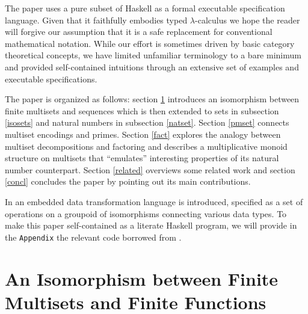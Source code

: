 \documentclass[]{INCLUDES/llncs}
\begin{document}
The paper uses a pure subset of Haskell as a formal executable specification
language. Given that it faithfully embodies typed $\lambda$-calculus
we hope the reader will forgive our assumption that it is a safe replacement for
conventional mathematical notation. While our effort is sometimes driven 
by basic category theoretical concepts, we have limited unfamiliar terminology
to a bare minimum and provided self-contained intuitions through an extensive
set of examples and executable specifications.

The paper is organized as follows: section \ref{msetiso} introduces an
isomorphism between finite multisets and sequences  which is then extended to
sets in subsection \ref{isosets} and natural numbers in subsection \ref{natset}.
Section \ref{pmset} connects multiset encodings and primes.
Section \ref{fact} explores the analogy between multiset decompositions and
factoring and describes a multiplicative monoid structure on multisets
that ``emulates'' interesting properties of its natural number counterpart.
Section \ref{related} overviews some related work and section \ref{concl}
concludes the paper by pointing out its main contributions.

In \cite{sac09fISO}
an embedded data transformation language is introduced, specified as a set of operations
on a groupoid of isomorphisms connecting various data types. To make this paper
self-contained as a literate Haskell program, we will provide in the
{\tt Appendix} the relevant code borrowed from \cite{sac09fISO}.

\section{An Isomorphism between Finite Multisets and Finite Functions}
\label{msetiso}
\end{document}
